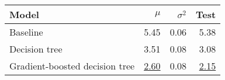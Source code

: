 \begin{tabular}{lrrr}
  \toprule
  Model                          & $\mu$            & $\sigma^2$ & Test
  \\
  \midrule
  Baseline                       & 5.45             & 0.06       & 5.38
  \\
  Decision tree                  & 3.51             & 0.08       & 3.08
  \\
  Gradient-boosted decision tree & \underline{2.60} & 0.08       & \underline{2.15}
  \\
  \bottomrule
\end{tabular}
